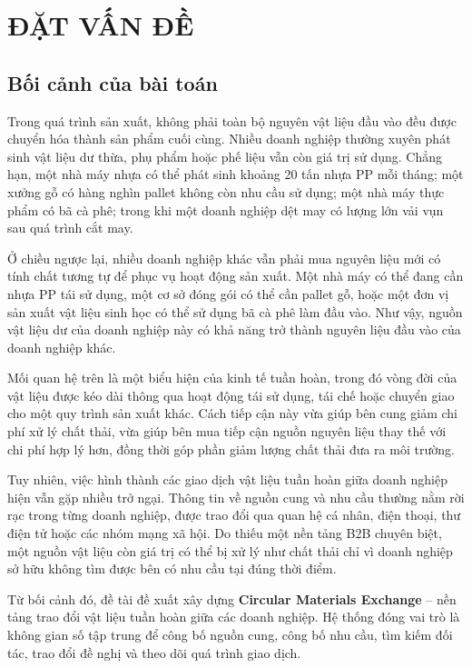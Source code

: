 \documentclass[12pt,a4paper,oneside]{report}
\begin{document}
\chapter{ĐẶT VẤN ĐỀ}
\label{chap:dat-van-de}

\section{Bối cảnh của bài toán}
\label{sec:boi-canh}

Trong quá trình sản xuất, không phải toàn bộ nguyên vật liệu đầu vào đều được
chuyển hóa thành sản phẩm cuối cùng. Nhiều doanh nghiệp thường xuyên phát sinh
vật liệu dư thừa, phụ phẩm hoặc phế liệu vẫn còn giá trị sử dụng. Chẳng hạn, một
nhà máy nhựa có thể phát sinh khoảng 20 tấn nhựa PP mỗi tháng; một xưởng gỗ có
hàng nghìn pallet không còn nhu cầu sử dụng; một nhà máy thực phẩm có bã cà phê;
trong khi một doanh nghiệp dệt may có lượng lớn vải vụn sau quá trình cắt may.

Ở chiều ngược lại, nhiều doanh nghiệp khác vẫn phải mua nguyên liệu mới có tính
chất tương tự để phục vụ hoạt động sản xuất. Một nhà máy có thể đang cần nhựa PP
tái sử dụng, một cơ sở đóng gói có thể cần pallet gỗ, hoặc một đơn vị sản xuất
vật liệu sinh học có thể sử dụng bã cà phê làm đầu vào. Như vậy, nguồn vật liệu
dư của doanh nghiệp này có khả năng trở thành nguyên liệu đầu vào của doanh
nghiệp khác.

Mối quan hệ trên là một biểu hiện của kinh tế tuần hoàn, trong đó vòng đời của
vật liệu được kéo dài thông qua hoạt động tái sử dụng, tái chế hoặc chuyển giao
cho một quy trình sản xuất khác. Cách tiếp cận này vừa giúp bên cung giảm chi phí
xử lý chất thải, vừa giúp bên mua tiếp cận nguồn nguyên liệu thay thế với chi phí
hợp lý hơn, đồng thời góp phần giảm lượng chất thải đưa ra môi trường.

Tuy nhiên, việc hình thành các giao dịch vật liệu tuần hoàn giữa doanh nghiệp
hiện vẫn gặp nhiều trở ngại. Thông tin về nguồn cung và nhu cầu thường nằm rời
rạc trong từng doanh nghiệp, được trao đổi qua quan hệ cá nhân, điện thoại, thư
điện tử hoặc các nhóm mạng xã hội. Do thiếu một nền tảng B2B chuyên biệt, một
nguồn vật liệu còn giá trị có thể bị xử lý như chất thải chỉ vì doanh nghiệp sở
hữu không tìm được bên có nhu cầu tại đúng thời điểm.

Từ bối cảnh đó, đề tài đề xuất xây dựng \textbf{Circular Materials Exchange}
-- nền tảng trao đổi vật liệu tuần hoàn giữa các doanh nghiệp. Hệ thống đóng vai
trò là không gian số tập trung để công bố nguồn cung, công bố nhu cầu, tìm kiếm
đối tác, trao đổi đề nghị và theo dõi quá trình giao dịch.
\end{document}
